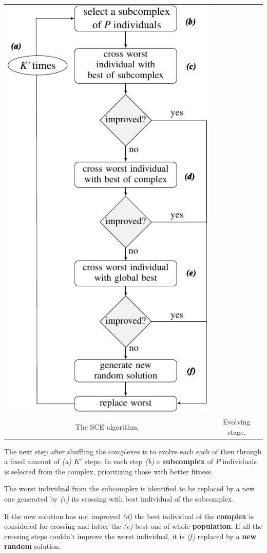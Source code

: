 \begin{center}
\begin{tabular}{@{\hspace{0.0em}}c@{\hspace{1.0em}}c@{\hspace{0.0em}}}
\hspace{-3mm}\includegraphics[width=0.46\linewidth]{imgs/flow2} \\
{\scriptsize The SCE algorithm.} & {\scriptsize Evolving stage.}
\end{tabular}
\end{center}
The next step after shuffling the complexes is to evolve each each of then through
a fixed amount of {\it (a)} $K'$ steps.
In each step {\it (b)} a {\bf subcomplex} of $P$ individuals is selected from the
complex, prioritizing those with better fitness.

The worst individual from the  subcomplex is identified to
be replaced by a new one generated by {\it (c)} its crossing 
with best individual of the subcomplex.

If the new solution has not improved {\it (d)} the best individual
of the {\bf complex} is considered for crossing and latter the {\it (e)} best one  
of whole {\bf population}.
If all the crossing steps couldn't improve the worst individual,
it is {\it (f)} replaced by a {\bf new random} solution.
